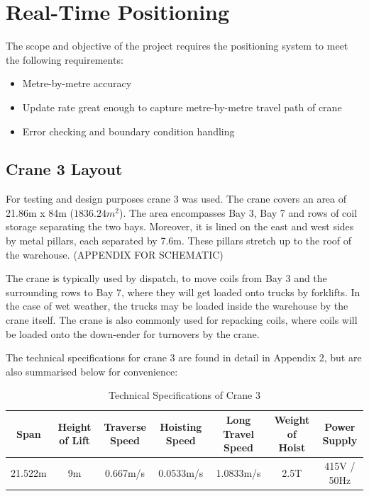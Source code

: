 \documentclass[12pt, a4paper]{article}
\begin{document}
\newpage

\section{Real-Time Positioning}
The scope and objective of the project requires the positioning system to meet the following requirements:
\begin{itemize}
    \item Metre-by-metre accuracy
    \item Update rate great enough to capture metre-by-metre travel path of crane
    \item Error checking and boundary condition handling
\end{itemize}
\subsection{Crane 3 Layout}
For testing and design purposes crane 3 was used. The crane covers an area of 21.86m x 84m ($1836.24m^2$). The area encompasses 
Bay 3, Bay 7 and rows of coil storage separating the two bays. Moreover, it is lined on the east and west sides by metal pillars, 
each separated by 7.6m. These pillars stretch up to the roof of the warehouse. (APPENDIX FOR SCHEMATIC)

The crane is typically used by dispatch, to move coils from Bay 3 and the surrounding rows to Bay 7, where they will get 
loaded onto trucks by forklifts. In the case of wet weather, the trucks may be loaded inside the warehouse by the crane itself. 
The crane is also commonly used for repacking coils, where coils will be loaded onto the down-ender for turnovers by the crane.

The technical specifications for crane 3 are found in detail in Appendix 2, but are also summarised below for convenience:
\begin{center}
    \begin{table}[h]
        \begin{adjustbox}{width=1.2\textwidth, center=\textwidth}
            \small
            \begin{tabular}{||c c c c c c c||}
                \hline
                Span & Height of Lift & Traverse Speed & Hoisting Speed & Long Travel Speed & Weight of Hoist & Power Supply \\
                \hline
                21.522m & 9m & 0.667m/s & 0.0533m/s & 1.0833m/s & 2.5T & 415V / 50Hz \\
                \hline
            \end{tabular}
        \end{adjustbox}
        \caption{Technical Specifications of Crane 3}
        \label{tab:crane_3_specs}
    \end{table}
\end{center}
\end{document}
